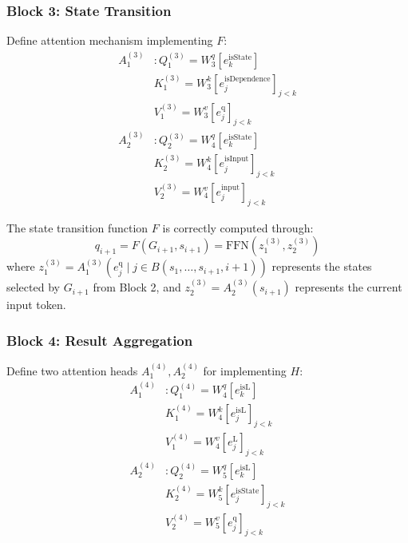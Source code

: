 \subsubsection{Block 3: State Transition}
Define attention mechanism implementing $F$:
\begin{align*}
    A^{(3)}_1&: Q^{(3)}_1 = W^q_3[e^{\text{isState}}_k] \\
    &K^{(3)}_1 = W^k_3[e^{\text{isDependence}}_j]_{j<k} \\
    &V^{(3)}_1 = W^v_3[e^{\text{q}}_j]_{j<k} \\
    A^{(3)}_2&: Q^{(3)}_2 = W^q_4[e^{\text{isState}}_k] \\
    &K^{(3)}_2 = W^k_4[e^{\text{isInput}}_j]_{j<k} \\
    &V^{(3)}_2 = W^v_4[e^{\text{input}}_j]_{j<k}
\end{align*}

\begin{lemma}
The state transition function $F$ is correctly computed through:
\begin{equation*}
    q_{i+1} = F(G_{i+1}, s_{i+1}) = \text{FFN}(z^{(3)}_1, z^{(3)}_2)
\end{equation*}
where $z^{(3)}_1 = A^{(3)}_1(e^{\text{q}}_j \mid j \in B(s_1,\ldots,s_{i+1}, i+1))$ represents the states selected by $G_{i+1}$ from Block 2, and $z^{(3)}_2 = A^{(3)}_2(s_{i+1})$ represents the current input token.
\end{lemma}

\subsubsection{Block 4: Result Aggregation}
Define two attention heads $A^{(4)}_1, A^{(4)}_2$ for implementing $H$:
\begin{align*}
    A^{(4)}_1&: Q^{(4)}_1 = W^q_4[e^{\text{isL}}_k] \\
    &K^{(4)}_1 = W^k_4[e^{\text{isL}}_j]_{j<k} \\
    &V^{(4)}_1 = W^v_4[e^{\text{L}}_j]_{j<k} \\
    A^{(4)}_2&: Q^{(4)}_2 = W^q_5[e^{\text{isL}}_k] \\
    &K^{(4)}_2 = W^k_5[e^{\text{isState}}_j]_{j<k} \\
    &V^{(4)}_2 = W^v_5[e^{\text{q}}_j]_{j<k}
\end{align*}


